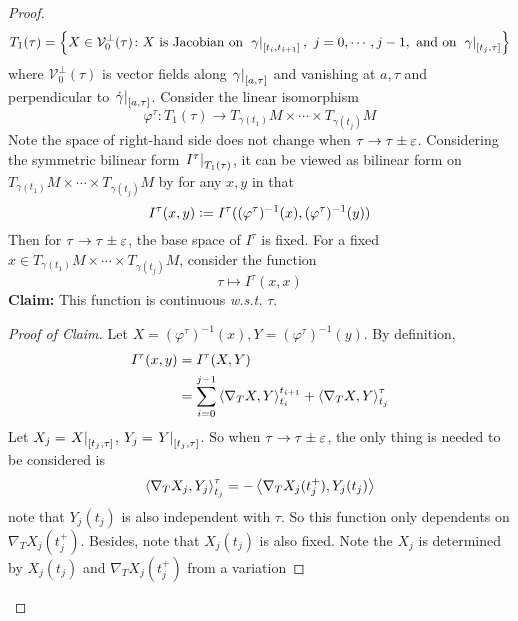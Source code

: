 \begin{enumerate}[label=\arabic{*}.]
\begin{proof}
		\begin{equation*}
			T_1(\tau) = \left\{X \in \mathcal{V}_0^\perp(\tau) \colon X \text{ is Jacobian on } \left.\gamma\right\lvert_{[t_i,t_{i+1}]},~j=0,\cdots,j-1, \text{ and on }\left.\gamma\right\lvert_{[t_j,\tau]}\right\}
		\end{equation*}
		where $\mathcal{V}_0^\perp(\tau)$ is vector fields along $\left.\gamma\right\lvert_{[a,\tau]}$ and vanishing at $a,\tau$ and perpendicular to $\left.\dot{\gamma}\right\lvert_{[a,\tau]}$. Consider the linear isomorphism
		\begin{equation*}
			\varphi^\tau \colon T_1(\tau) \longrightarrow T_{\gamma(t_1)}M \times \cdots \times T_{\gamma(t_j)}M
		\end{equation*}
		Note the space of right-hand side does not change when $ \tau \rightarrow \tau \pm \varepsilon$. Considering the symmetric bilinear form $\left.I^\tau\right\lvert_{T_1(\tau)}$, it can be viewed as bilinear form on $T_{\gamma(t_1)}M \times \cdots \times T_{\gamma(t_j)}M$ by for any $x, y$ in that
		\begin{equation*}
			I^\tau(x,y) \vcentcolon= I^\tau((\varphi^{\tau})^{-1}(x),(\varphi^{\tau})^{-1}(y))
		\end{equation*}
		Then for $ \tau \rightarrow \tau \pm \varepsilon$, the base space of $I^\tau$ is fixed. For a fixed $x \in T_{\gamma(t_1)}M \times \cdots \times T_{\gamma(t_j)}M$, consider the function
		\begin{equation*}
			\tau \mapsto I^\tau(x,x)
		\end{equation*}
		\textbf{Claim:} This function is continuous \emph{w.s.t.} $\tau$.
		\begin{proof}[Proof of Claim]
			Let $X = (\varphi^{\tau})^{-1}(x), Y = (\varphi^{\tau})^{-1}(y)$. By definition,
			\begin{equation*}
				\begin{aligned}
					I^\tau(x,y) &= I^\tau(X,Y) \\
					&= \sum_{i=0}^{j-1}\left\langle \nabla_TX,Y \right\rangle_{t_i}^{t_{i+1}} + \left\langle \nabla_TX,Y \right\rangle_{t_j}^\tau 
				\end{aligned}
			\end{equation*}
			Let $X_j = \left.X\right\lvert_{[t_j,\tau]}$, $Y_j = \left.Y\right\lvert_{[t_j,\tau]}$. So when $ \tau \rightarrow \tau \pm \varepsilon$, the only thing is needed to be considered is
			\begin{equation*}
				\left\langle \nabla_TX_j,Y_j \right\rangle_{t_j}^\tau = - \left\langle \nabla_TX_j(t_j^+),Y_j(t_j) \right\rangle
			\end{equation*}
			note that $Y_j(t_j)$ is also independent with $\tau$. So this function only dependents on $\nabla_TX_j(t_j^+)$. Besides, note that $X_j(t_j)$ is also fixed. Note the $X_j$ is determined by $X_j(t_j)$ and $\nabla_TX_j(t_j^+)$ from a variation

\end{proof}
\end{proof}
\end{enumerate}
